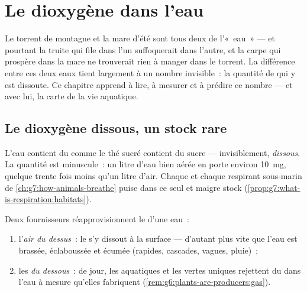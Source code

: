 \chapter{Le dioxygène dans l'eau}\label{ch:g7:oxygen-in-the-water}

Le torrent de montagne et la mare d'été sont tous deux de
l'«~eau~» --- et pourtant la truite qui file dans l'un suffoquerait
dans l'autre, et la carpe qui prospère dans la mare ne trouverait
rien à manger dans le torrent. La différence entre ces deux eaux
tient largement à un nombre invisible~: la quantité de  qui
y est dissoute. Ce chapitre apprend à lire, à mesurer et à prédire
ce nombre --- et avec lui, la carte de la vie aquatique.

\section{Le dioxygène dissous, un stock rare}

\begin{definition}\label{def:g7:oxygen-in-the-water:dissolved}
L'eau contient du  comme le thé sucré contient du sucre ---
invisiblement, \emph{dissous}. La quantité
est minuscule~: un litre d'eau bien aérée en porte environ
\qty{10}{mg}, quelque trente fois moins qu'un litre d'air. Chaque
 et chaque respirant sous-marin de
\cref{ch:g7:how-animals-breathe} puise dans ce seul et maigre stock
(\cref{prop:g7:what-is-respiration:habitats}).
\end{definition}

\begin{proposition}\label{prop:g7:oxygen-in-the-water:fills}
Deux fournisseurs réapprovisionnent le  d'une eau~:
\begin{enumerate}
  \item l'\emph{air du dessus}~: le  s'y dissout à la
        surface --- d'autant plus vite que l'eau est brassée,
        éclaboussée et écumée (rapides, cascades, vagues, pluie)~;
  \item les \emph{ du dessous}~: de jour, les 
        aquatiques et les  vertes uniques rejettent du
         dans l'eau à mesure qu'elles fabriquent
        (\cref{rem:g6:plants-are-producers:gas}).
\end{enumerate}
\end{proposition}
\admitted

